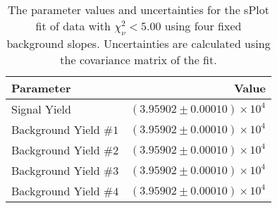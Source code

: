 
\begin{table}[ht]
    \begin{center}
        \begin{tabular}{lr}\toprule
            Parameter & Value \\\midrule
            Signal Yield & $(3.95902 \pm 0.00010) \times 10^{4}$ \\
            Background Yield $\#1$ & $(3.95902 \pm 0.00010) \times 10^{4}$ \\
            Background Yield $\#2$ & $(3.95902 \pm 0.00010) \times 10^{4}$ \\
            Background Yield $\#3$ & $(3.95902 \pm 0.00010) \times 10^{4}$ \\
            Background Yield $\#4$ & $(3.95902 \pm 0.00010) \times 10^{4}$ \\\bottomrule
        \end{tabular}
        \caption{The parameter values and uncertainties for the sPlot fit of data with $\chi^2_\nu < 5.00$ using four fixed background slopes. Uncertainties are calculated using the covariance matrix of the fit.}\label{tab:splot-fit-results-chisqdof-5.00-fixed-4}
    \end{center}
\end{table}
